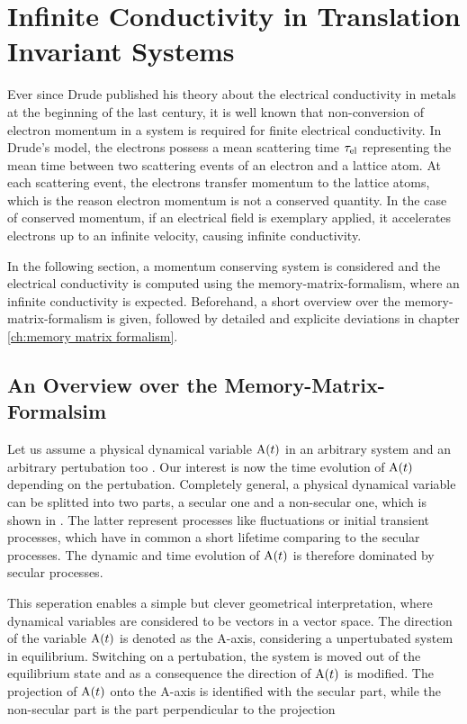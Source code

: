 %
%
%
\chapter{Infinite Conductivity in Translation Invariant Systems}
\label{ch:infinite conductivity}
%
%
%
Ever since Drude published his theory about the electrical conductivity in metals \cite{Drude} at the beginning of the last century, it is well known that non-conversion of electron momentum in a system is required for finite electrical conductivity.
In Drude's model, the electrons possess a mean scattering time $\tau_{\mathrm{el}}$ representing the mean time between two scattering events of an electron and a lattice atom.
At each scattering event, the electrons transfer momentum to the lattice atoms, which is the reason electron momentum is not a conserved quantity.
In the case of conserved momentum, if an electrical field is exemplary applied, it accelerates electrons up to an infinite velocity, causing infinite conductivity.

In the following section, a momentum conserving system is considered and the electrical conductivity is computed using the memory-matrix-formalism, where an infinite conductivity is expected.
Beforehand, a short overview over the memory-matrix-formalism is given, followed by detailed and explicite deviations in chapter \ref{ch:memory matrix formalism}.
%
%
\section{An Overview over the Memory-Matrix-Formalsim}
\label{sec:overview MMF}
%
%
Let us assume a physical dynamical variable $\mathrm{A}(t)$ in an arbitrary system and an arbitrary pertubation too	.
Our interest is now the time evolution of $\mathrm{A}(t)$ depending on the pertubation.
Completely general, a physical dynamical variable can be splitted into two parts, a secular one and a non-secular one, which is shown in \cite{Mori}.
The latter represent processes like fluctuations or initial transient processes, which have in common a short lifetime comparing to the secular processes.
The dynamic and time evolution of $\mathrm{A}(t)$ is therefore dominated by secular processes.

This seperation enables a simple but clever geometrical interpretation, where dynamical variables are considered to be vectors in a vector space.
The direction of the variable $\mathrm{A}(t)$ is denoted as the A-axis, considering a unpertubated system in equilibrium.
Switching on a pertubation, the system is moved out of the equilibrium state and as a consequence the direction of $\mathrm{A}(t)$ is modified.
The projection of $\mathrm{A}(t)$ onto the A-axis is identified with the secular part, while the non-secular part is the part perpendicular to the projection 

